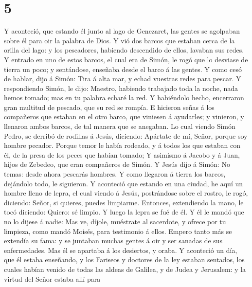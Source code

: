 \hypertarget{section-4}{%
\section{5}\label{section-4}}

 Y aconteció, que estando él junto al lago de Genezaret,
las gentes se agolpaban sobre él para oir la palabra de Dios.
 Y vió dos barcos que estaban cerca de la orilla del lago:
y los pescadores, habiendo descendido de ellos, lavaban sus redes.
 Y entrado en uno de estos barcos, el cual era de Simón,
le rogó que lo desviase de tierra un poco; y sentándose, enseñaba desde
el barco á las gentes.  Y como cesó de hablar, dijo á
Simón: Tira á alta mar, y echad vuestras redes para pescar.
 Y respondiendo Simón, le dijo: Maestro, habiendo
trabajado toda la noche, nada hemos tomado; mas en tu palabra echaré la
red.  Y habiéndolo hecho, encerraron gran multitud de
pescado, que su red se rompía.  E hicieron señas á los
compañeros que estaban en el otro barco, que viniesen á ayudarles; y
vinieron, y llenaron ambos barcos, de tal manera que se anegaban.
 Lo cual viendo Simón Pedro, se derribó de rodillas á
Jesús, diciendo: Apártate de mí, Señor, porque soy hombre pecador.
 Porque temor le había rodeado, y á todos los que estaban
con él, de la presa de los peces que habían tomado;  Y
asimismo á Jacobo y á Juan, hijos de Zebedeo, que eran compañeros de
Simón. Y Jesús dijo á Simón: No temas: desde ahora pescarás hombres.
 Y como llegaron á tierra los barcos, dejándolo todo, le
siguieron.  Y aconteció que estando en una ciudad, he
aquí un hombre lleno de lepra, el cual viendo á Jesús, postrándose sobre
el rostro, le rogó, diciendo: Señor, si quieres, puedes limpiarme.
 Entonces, extendiendo la mano, le tocó diciendo: Quiero:
sé limpio. Y luego la lepra se fué de él.  Y él le mandó
que no lo dijese á nadie: Mas ve, díjole, muéstrate al sacerdote, y
ofrece por tu limpieza, como mandó Moisés, para testimonio á ellos.
 Empero tanto más se extendía su fama: y se juntaban
muchas gentes á oir y ser sanadas de sus enfermedades. 
Mas él se apartaba á los desiertos, y oraba.  Y aconteció
un día, que él estaba enseñando, y los Fariseos y doctores de la ley
estaban sentados, los cuales habían venido de todas las aldeas de
Galilea, y de Judea y Jerusalem: y la virtud del Señor estaba allí para
